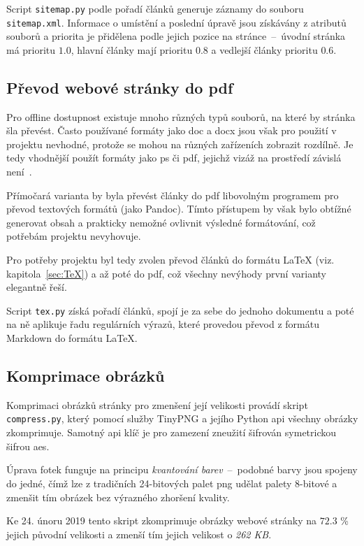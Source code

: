 \documentclass[a4paper, 12pt]{article}
\begin{document}
  Script \texttt{sitemap.py} podle pořadí článků generuje záznamy do souboru \texttt{sitemap.xml}. Informace o umístění a poslední úpravě jsou získávány z atributů souborů a priorita je přidělena podle jejich pozice na stránce~--~úvodní stránka má prioritu $1.0$, hlavní články mají prioritu $0.8$ a vedlejší články prioritu $0.6$.


  \subsection{Převod webové stránky do \acrshort{pdf}} \label{sec:Převod webové stránky do PDF}
  Pro offline dostupnost existuje mnoho různých typů souborů, na které by stránka šla převést. Často používané formáty jako \gls{doc} a \gls{docx} jsou však pro použití v projektu nevhodné, protože se mohou na různých zařízeních zobrazit rozdílně. Je tedy vhodnější použít formáty jako \gls{ps} či \gls{pdf}, jejichž vizáž na prostředí závislá není~\cite{history-of-pdf}.

  Přímočará varianta by byla převést články do \gls{pdf} libovolným programem pro převod textových formátů (jako Pandoc). Tímto přístupem by však bylo obtížné generovat obsah a prakticky nemožné ovlivnit výsledné formátování, což potřebám projektu nevyhovuje.

  Pro potřeby projektu byl tedy zvolen převod článků do formátu \LaTeX{} (viz. kapitola~\ref{sec:TeX}) a až poté do \gls{pdf}, což všechny nevýhody první varianty elegantně řeší.

  Script \texttt{tex.py} získá pořadí článků, spojí je za sebe do jednoho dokumentu a poté na ně aplikuje řadu regulárních výrazů, které provedou převod z formátu Markdown do formátu \LaTeX.


  \subsection{Komprimace obrázků}
  Komprimaci obrázků stránky pro zmenšení její velikosti provádí skript \texttt{compress.py}, který pomocí služby TinyPNG a jejího Python \gls{api} všechny obrázky zkomprimuje. Samotný \gls{api} klíč je pro zamezení zneužití šifrován symetrickou šifrou \gls{aes}.

  Úprava fotek funguje na principu \emph{kvantování barev}~--~podobné barvy jsou spojeny do jedné, čímž lze z tradičních 24-bitových palet \gls{png} udělat palety 8-bitové a zmenšit tím obrázek bez výrazného zhoršení kvality.

  Ke 24. únoru 2019 tento skript zkomprimuje obrázky webové stránky na $72.3$ \% jejich původní velikosti a zmenší tím jejich velikost o \emph{262 KB}.
\end{document}
